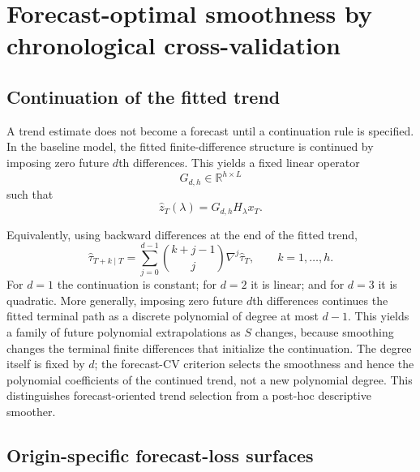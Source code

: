 \section{Forecast-optimal smoothness by chronological cross-validation}
\label{sec:forecast_cv}

\subsection{Continuation of the fitted trend}

A trend estimate does not become a forecast until a continuation rule is specified. In the baseline model, the fitted finite-difference structure is continued by imposing zero future $d$th differences. This yields a fixed linear operator
\begin{equation}
\label{eq:continuation_operator_space}
G_{d,h}\in\mathbb{R}^{h\times L}
\end{equation}
such that
\begin{equation}
\label{eq:forecast_operator}
\widehat z_T(\lambda)
=
G_{d,h}H_\lambda x_T.
\end{equation}

Equivalently, using backward differences at the end of the fitted trend,
\begin{equation}
\label{eq:continuation}
\widehat\tau_{T+k\mid T}
=
\sum_{j=0}^{d-1}
\binom{k+j-1}{j}
\nabla^j\widehat\tau_T,
\qquad
k=1,\ldots,h.
\end{equation}
For $d=1$ the continuation is constant; for $d=2$ it is linear; and for $d=3$ it is quadratic.
More generally, imposing zero future $d$th differences continues
the fitted terminal path as a discrete polynomial of degree at most
$d-1$. This yields a family of future polynomial extrapolations as
$S$ changes, because smoothing changes the terminal finite
differences that initialize the continuation. The degree itself
is fixed by $d$; the forecast-CV criterion selects the smoothness
and hence the polynomial coefficients of the continued trend,
not a new polynomial degree. This distinguishes forecast-oriented
trend selection from a post-hoc descriptive smoother.

\subsection{Origin-specific forecast-loss surfaces}

